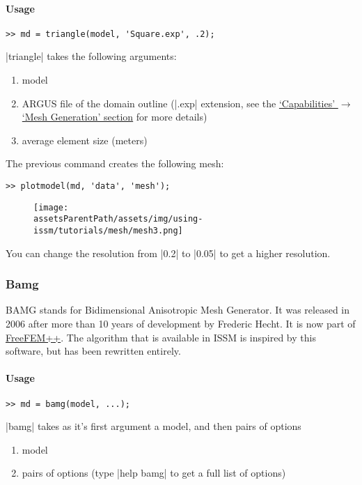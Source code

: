 \paragraph{Usage}%
\begin{lstlisting}
>> md = triangle(model, 'Square.exp', .2);
\end{lstlisting}
\lstinlinebg|triangle| takes the following arguments:
\begin{enumerate}
	\item model
	\item ARGUS file of the domain outline (\lstinlinebg|.exp| extension, see the 
	\hyperref[sec:using-issm-capabilities-mesh-generation]{`Capabilities' $\rightarrow$ `Mesh Generation' section}
	for more details)
	\item average element size (meters)
\end{enumerate}
The previous command creates the following mesh:
\begin{lstlisting}
>> plotmodel(md, 'data', 'mesh');
\end{lstlisting}
\begin{figure}[H]
	\begin{center}
		\texttt{[image: \\assetsParentPath/assets/img/using-issm/tutorials/mesh/mesh3.png]}
	\end{center}
\end{figure}
You can change the resolution from \lstinlinebg|0.2| to \lstinlinebg|0.05| to get a higher resolution.

\subsubsection{Bamg}%
BAMG stands for Bidimensional Anisotropic Mesh Generator. It was released in 2006 after more than 10 years of development by Frederic Hecht. It is now part of \href{http://www.freefem.org/ff++/}{FreeFEM++}. The algorithm that is available in ISSM is inspired by this software, but has been rewritten entirely.

\paragraph{Usage}%
\begin{lstlisting}
>> md = bamg(model, ...);
\end{lstlisting}
\lstinlinebg|bamg| takes as it's first argument a model, and then pairs of options
\begin{enumerate}
	\item model
	\item pairs of options (type \lstinlinebg|help bamg| to get a full list of options)
\end{enumerate}

